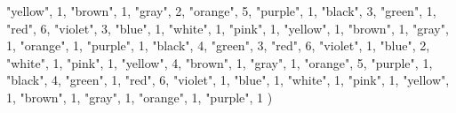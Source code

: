 \documentclass[
]{article}
\newenvironment{Shaded}{\begin{snugshade}}{\end{snugshade}}
\newcommand{\DecValTok}[1]{\textcolor[rgb]{0.00,0.00,0.81}{#1}}
\newcommand{\NormalTok}[1]{#1}
\newcommand{\StringTok}[1]{\textcolor[rgb]{0.31,0.60,0.02}{#1}}
\begin{document}
\begin{Shaded}
\begin{Highlighting}[]
  \StringTok{"yellow"}\NormalTok{, }\DecValTok{1}\NormalTok{,}
  \StringTok{"brown"}\NormalTok{, }\DecValTok{1}\NormalTok{,}
  \StringTok{"gray"}\NormalTok{, }\DecValTok{2}\NormalTok{,}
  \StringTok{"orange"}\NormalTok{, }\DecValTok{5}\NormalTok{,}
  \StringTok{"purple"}\NormalTok{, }\DecValTok{1}\NormalTok{,}
    \StringTok{"black"}\NormalTok{, }\DecValTok{3}\NormalTok{,}
  \StringTok{"green"}\NormalTok{, }\DecValTok{1}\NormalTok{,}
  \StringTok{"red"}\NormalTok{, }\DecValTok{6}\NormalTok{,}
  \StringTok{"violet"}\NormalTok{, }\DecValTok{3}\NormalTok{,}
  \StringTok{"blue"}\NormalTok{, }\DecValTok{1}\NormalTok{,}
  \StringTok{"white"}\NormalTok{, }\DecValTok{1}\NormalTok{,}
  \StringTok{"pink"}\NormalTok{, }\DecValTok{1}\NormalTok{,}
  \StringTok{"yellow"}\NormalTok{, }\DecValTok{1}\NormalTok{,}
  \StringTok{"brown"}\NormalTok{, }\DecValTok{1}\NormalTok{,}
  \StringTok{"gray"}\NormalTok{, }\DecValTok{1}\NormalTok{,}
  \StringTok{"orange"}\NormalTok{, }\DecValTok{1}\NormalTok{,}
  \StringTok{"purple"}\NormalTok{, }\DecValTok{1}\NormalTok{,}
    \StringTok{"black"}\NormalTok{, }\DecValTok{4}\NormalTok{,}
  \StringTok{"green"}\NormalTok{, }\DecValTok{3}\NormalTok{,}
  \StringTok{"red"}\NormalTok{, }\DecValTok{6}\NormalTok{,}
  \StringTok{"violet"}\NormalTok{, }\DecValTok{1}\NormalTok{,}
  \StringTok{"blue"}\NormalTok{, }\DecValTok{2}\NormalTok{,}
  \StringTok{"white"}\NormalTok{, }\DecValTok{1}\NormalTok{,}
  \StringTok{"pink"}\NormalTok{, }\DecValTok{1}\NormalTok{,}
  \StringTok{"yellow"}\NormalTok{, }\DecValTok{4}\NormalTok{,}
  \StringTok{"brown"}\NormalTok{, }\DecValTok{1}\NormalTok{,}
  \StringTok{"gray"}\NormalTok{, }\DecValTok{1}\NormalTok{,}
  \StringTok{"orange"}\NormalTok{, }\DecValTok{5}\NormalTok{,}
  \StringTok{"purple"}\NormalTok{, }\DecValTok{1}\NormalTok{,}
    \StringTok{"black"}\NormalTok{, }\DecValTok{4}\NormalTok{,}
  \StringTok{"green"}\NormalTok{, }\DecValTok{1}\NormalTok{,}
  \StringTok{"red"}\NormalTok{, }\DecValTok{6}\NormalTok{,}
  \StringTok{"violet"}\NormalTok{, }\DecValTok{1}\NormalTok{,}
  \StringTok{"blue"}\NormalTok{, }\DecValTok{1}\NormalTok{,}
  \StringTok{"white"}\NormalTok{, }\DecValTok{1}\NormalTok{,}
  \StringTok{"pink"}\NormalTok{, }\DecValTok{1}\NormalTok{,}
  \StringTok{"yellow"}\NormalTok{, }\DecValTok{1}\NormalTok{,}
  \StringTok{"brown"}\NormalTok{, }\DecValTok{1}\NormalTok{,}
  \StringTok{"gray"}\NormalTok{, }\DecValTok{1}\NormalTok{,}
  \StringTok{"orange"}\NormalTok{, }\DecValTok{1}\NormalTok{,}
  \StringTok{"purple"}\NormalTok{, }\DecValTok{1}
\NormalTok{)}


\end{Highlighting}
\end{Shaded}
\end{document}
